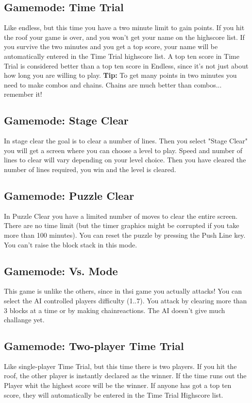 \documentclass[11pt,a4paper]{article}
\begin{document}
\subsection{Gamemode: Time Trial}
Like endless, but this time you have a two minute limit to gain
points. If you hit the roof your game is over, and you won't get
your name on the highscore list. If you survive the two minutes
and you get a top score, your name will be automatically entered
in the Time Trial highscore list. A top ten score in Time Trial is
considered better than a top ten score in Endless, since it's not
just about how long you are willing to play. \newline
\textbf{Tip:} To get many points in two minutes you need to make
combos and chains. Chains are much better than combos... remember
it!
\subsection{Gamemode: Stage Clear}
In stage clear the goal is to clear a number of lines. Then you
select "Stage Clear" you will get a screen where you can choose a
level to play. Speed and number of lines to clear will vary
depending on your level choice. Then you have cleared the number
of lines required, you win and the level is cleared.
\subsection{Gamemode: Puzzle Clear}
In Puzzle Clear you have a limited number of moves to clear the
entire screen. There are no time limit (but the timer graphics
might be corrupted if you take more than 100 minutes). You can
reset the puzzle by pressing the Push Line key. You can't raise
the block stack in this mode.
\subsection{Gamemode: Vs. Mode}
This game is unlike the others, since in thsi game you actually attacks! You can select the AI controlled players difficulty (1..7). You attack by clearing more than 3 blocks at a time or by making chainreactions. The AI doesn't give much challange yet.
\subsection{Gamemode: Two-player Time Trial}
Like single-player Time Trial, but this time there is two players.
If you hit the roof, the other player is instantly declared as the
winner. If the time runs out the Player whit the highest score
will be the winner. If anyone has got a top ten score, they will
automatically be entered in the Time Trial Highscore list.
\end{document}
